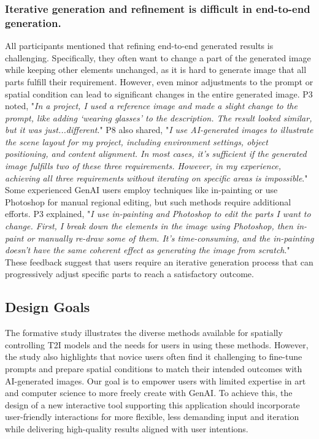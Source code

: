 \subsubsection{Iterative generation and refinement is difficult in end-to-end generation.}
All participants mentioned that refining end-to-end generated results is challenging. 
Specifically, they often want to change a part of the generated image while keeping other elements unchanged, as it is hard to generate image that all parts fulfill their requirement. 
However, even minor adjustments to the prompt or spatial condition can lead to significant changes in the entire generated image. 
P3 noted, "\emph{In a project, I used a reference image and made a slight change to the prompt, like adding `wearing glasses' to the description. The result looked similar, but it was just...different}."
P8 also shared, "\emph{I use AI-generated images to illustrate the scene layout for my project, including environment settings, object positioning, and content alignment. In most cases, it’s sufficient if the generated image fulfills two of these three requirements. However, in my experience, achieving all three requirements without iterating on specific areas is impossible}."
Some experienced GenAI users employ techniques like in-painting or use Photoshop for manual regional editing, but such methods require additional efforts. 
P3 explained, "\emph{I use in-painting and Photoshop to edit the parts I want to change. First, I break down the elements in the image using Photoshop, then in-paint or manually re-draw some of them. It’s time-consuming, and the in-painting doesn’t have the same coherent effect as generating the image from scratch}."
These feedback suggest that users require an iterative generation process that can progressively adjust specific parts to reach a satisfactory outcome.


\subsection{Design Goals}
The formative study illustrates the diverse methods available for spatially controlling T2I models and the needs for users in using these methods. 
However, the study also highlights that novice users often find it challenging to fine-tune prompts and prepare spatial conditions to match their intended outcomes with AI-generated images.
Our goal is to empower users with limited expertise in art and computer science to more freely create with GenAI. %
To achieve this, the design of a new interactive tool supporting this application should incorporate user-friendly interactions for more flexible, less demanding input and iteration while delivering high-quality results aligned with user intentions.

